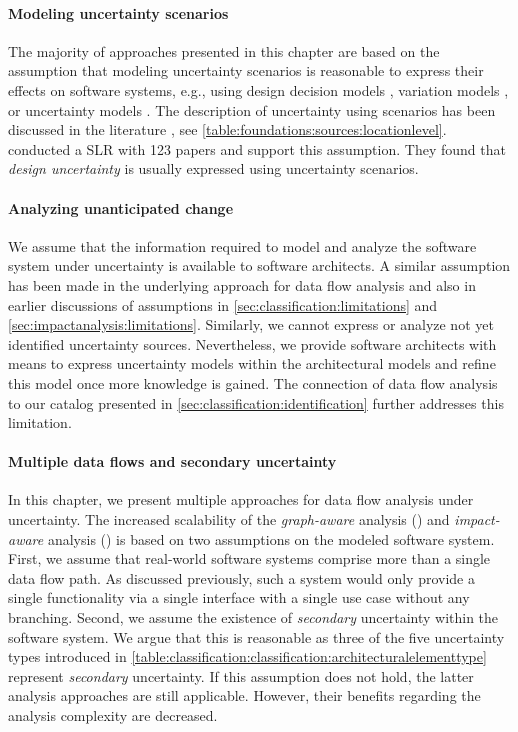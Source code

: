 \paragraph{Modeling uncertainty scenarios}
The majority of approaches presented in this chapter are based on the assumption that modeling uncertainty scenarios is reasonable to express their effects on software systems, e.g., using design decision models \cite{koziolek_peropteryx_2011}, variation models \cite{walter_architecture-based_2023}, or uncertainty models \cite{hahner_model-based_2023}.
The description of uncertainty using scenarios has been discussed in the literature \cite{walker_defining_2003,mahdavi-hezavehi_classification_2017,armour_five_2000}, see \autoref{table:foundations:sources:locationlevel}.
\textcite{troya_uncertainty_2021} conducted a \acf{SLR} with 123 papers and support this assumption.
They found that \emph{design uncertainty} is usually expressed using uncertainty scenarios.

\paragraph{Analyzing unanticipated change}
We assume that the information required to model and analyze the software system under uncertainty is available to software architects.
A similar assumption has been made in the underlying approach for data flow analysis \cite{seifermann_architectural_2022} and also in earlier discussions of assumptions in \autoref{sec:classification:limitations} and \autoref{sec:impactanalysis:limitations}.
Similarly, we cannot express or analyze not yet identified uncertainty sources.
Nevertheless, we provide software architects with means to express uncertainty models within the architectural models and refine this model once more knowledge is gained.
The connection of data flow analysis to our catalog presented in \autoref{sec:classification:identification} further addresses this limitation. 

\paragraph{Multiple data flows and secondary uncertainty}
In this chapter, we present multiple approaches for data flow analysis under uncertainty.
The increased scalability of the \emph{graph-aware} analysis () and \emph{impact-aware} analysis () is based on two assumptions on the modeled software system.
First, we assume that real-world software systems comprise more than a single data flow path.
As discussed previously, such a system would only provide a single functionality via a single interface with a single use case without any branching.
Second, we assume the existence of \emph{secondary} uncertainty within the software system.
We argue that this is reasonable as three of the five uncertainty types introduced in \autoref{table:classification:classification:architecturalelementtype} represent \emph{secondary} uncertainty.
If this assumption does not hold, the latter analysis approaches are still applicable.
However, their benefits regarding the analysis complexity are decreased.

